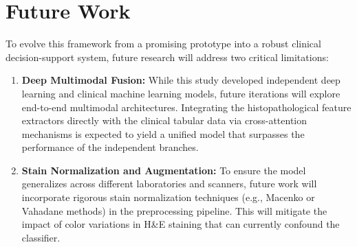 \documentclass[conference]{IEEEtran}
\begin{document}
\section{Future Work}
To evolve this framework from a promising prototype into a robust clinical 
decision-support system, future research will address two critical limitations:

\begin{enumerate}
    \item \textbf{Deep Multimodal Fusion:} While this study developed independent 
    deep learning and clinical machine learning models, future iterations will 
    explore end-to-end multimodal architectures. 
    Integrating the histopathological feature extractors directly with the clinical 
    tabular data via cross-attention mechanisms is expected to yield a unified model 
    that surpasses the performance of the independent branches.

    \item \textbf{Stain Normalization and Augmentation:} To ensure the model 
    generalizes across different laboratories and scanners, future work will incorporate 
    rigorous stain normalization techniques (e.g., Macenko \cite{macenko2009} 
    or Vahadane \cite{vahadane2016_stainnorm} methods) in the preprocessing pipeline. 
    This will mitigate the impact of color variations in H\&E staining that can 
    currently confound the classifier.

\end{enumerate}



\end{document}
